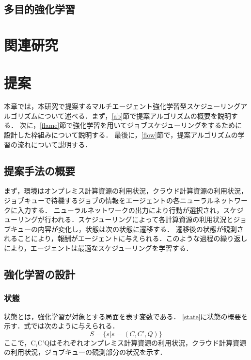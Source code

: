 \documentclass[12pt,oneside]{ise-thesis} %
\begin{document}
\section{多目的強化学習}



\chapter{関連研究}



\chapter{提案}
本章では，本研究で提案するマルチエージェント強化学習型スケジューリングアルゴリズムについて述べる．まず，\ref{ab}節で提案アルゴリズムの概要を説明する．
次に，\ref{flame}節で強化学習を用いてジョブスケジューリングをするために設計した枠組みについて説明する．
最後に，\ref{flow}節で，提案アルゴリズムの学習の流れについて説明する．
\section{提案手法の概要}
まず，環境はオンプレミス計算資源の利用状況，クラウド計算資源の利用状況，ジョブキューで待機するジョブの情報をエージェントの各ニューラルネットワークに入力する．
ニューラルネットワークの出力により行動が選択され，スケジューリングが行われる．スケジューリングによって各計算資源の利用状況とジョブキューの内容が変化し，状態は次の状態に遷移する．
遷移後の状態が観測されることにより，報酬がエージェントに与えられる．このような過程の繰り返しにより，エージェントは最適なスケジューリングを学習する．

\section{強化学習の設計}
\subsection{状態}
状態とは，強化学習が対象とする局面を表す変数である．
\ref{state}に状態の概要を示す．式では次のように与えられる．
\begin{equation}
    S=\{s|s=(C,C',Q)\}
\end{equation}
ここで，C,C'Qはそれぞれオンプレミス計算資源の利用状況，クラウド計算資源の利用状況，ジョブキューの観測部分の状況を示す．
\end{document}
